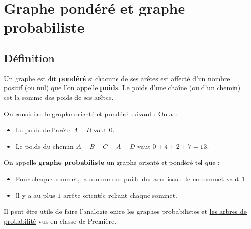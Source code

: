 



	\section{Graphe pondéré et graphe probabiliste}

	\subsection{Définition}

	\begin{formula}
		Un graphe est dit \textbf{pondéré} si chacune de ses arêtes est affecté d'un nombre positif (ou nul) que l'on appelle \textbf{poids}.
		\newpar
		Le poids d'une chaîne (ou d'un chemin) est la somme des poids de ses arêtes.
	\end{formula}

	\begin{tip}[Exemple]
		On considère le graphe orienté et pondéré suivant :
		On a :
		\begin{itemize}
			\item Le poids de l'arête $A-B$ vaut $0$.
			\item Le poids du chemin $A-B-C-A-D$ vaut $0+4+2+7 = 13$.
		\end{itemize}
	\end{tip}

	\begin{formula}
		On appelle \textbf{graphe probabiliste} un graphe orienté et pondéré tel que :
		\begin{itemize}
			\item Pour chaque sommet, la somme des poids des arcs issus de ce sommet vaut $1$.
			\item Il y a au plus $1$ arrête orientée reliant chaque sommet.
		\end{itemize}
	\end{formula}

	Il peut être utile de faire l'analogie entre les graphes probabilistes et \href{https://bacomathiqu.es/cours/premiere/probabilites/#arbre-de-probabilit\%C3\%A9}{les arbres de probabilité} vus en classe de Première.

